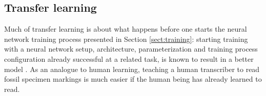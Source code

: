 \documentclass{article}
\begin{document}
\subsection{Transfer learning}

Much of transfer learning is about what happens before one starts the neural network training process 
presented in Section \ref{sect:training}: starting training with a neural network setup, 
architecture, parameterization and training process configuration already successful at a related task,
is known to result in a better model \cite{transferlearning_survey}. As an analogue to human learning, teaching a human transcriber
to read fossil specimen markings is much easier if the human being has already learned to read.


\end{document}
